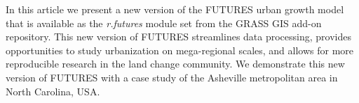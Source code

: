 \documentclass{isprs}
\begin{document}
In this article we present a new version of the FUTURES urban growth model that is 
available as the \emph{r.futures} module set from the GRASS GIS add-on repository.
This new version of FUTURES
streamlines data processing, provides opportunities to study urbanization on mega-regional scales, 
and allows for more reproducible research in the land change community. 
We demonstrate this new version of FUTURES with a case study of the Asheville metropolitan area in North Carolina, USA.















%   
\end{document}
